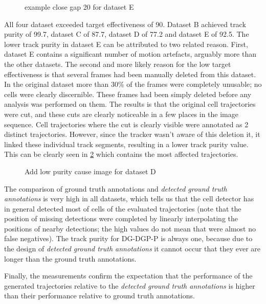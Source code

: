 		\begin{figure}[h]
			\centering
			\caption{example close gap 20 for dataset E}
			\label{fig:results_tracking_analysisE}
		\end{figure}

		All four dataset exceeded target effectiveness of 90. Dataset B achieved track purity of 99.7, dataset C of 87.7, dataset D of 77.2 and dataset E of 92.5. The lower track purity in dataset E can be attributed to two related reason. First, dataset E contains a significant number of motion artefacts, arguably more than the other datasets. The second and more likely reason for the low target effectiveness is that several frames had been manually deleted from this dataset. In the original dataset more than 30\% of the frames were completely unusable; no cells were clearly discernible. These frames had been simply deleted before any analysis was performed on them. The results is that the original cell trajectories were cut, and these cuts are clearly noticeable in a few places in the image sequence. Cell trajectories where the cut is clearly visible were annotated as 2 distinct trajectories. However, since the tracker wasn't aware of this deletion it, it linked these individual track segments, resulting in a lower track purity value. This can be clearly seen in \cref{fig:results_tracking_analysisD} which contains the most affected trajectories.
		
		\begin{figure}[h]
			\centering
			\caption{Add low purity cause image for dataset D}
			\label{fig:results_tracking_analysisD}
		\end{figure}
		
		The comparison of ground truth annotations and \textit{detected ground truth annotations} is very high in all datasets, which tells us that the cell detector has in general detected most of cells of the evaluated trajectories (note that the position of missing detections were completed by linearly interpolating the positions of nearby detections; the high values do not mean that were almost no false negatives). The track purity for DG-DGP-P is always one, because due to the design of \textit{detected ground truth annotations} it cannot occur that they ever are longer than the ground truth annotations.
		
		Finally, the measurements confirm the expectation that the performance of the generated trajectories relative to the \textit{detected ground truth annotations} is higher than their performance relative to ground truth annotations.
		
